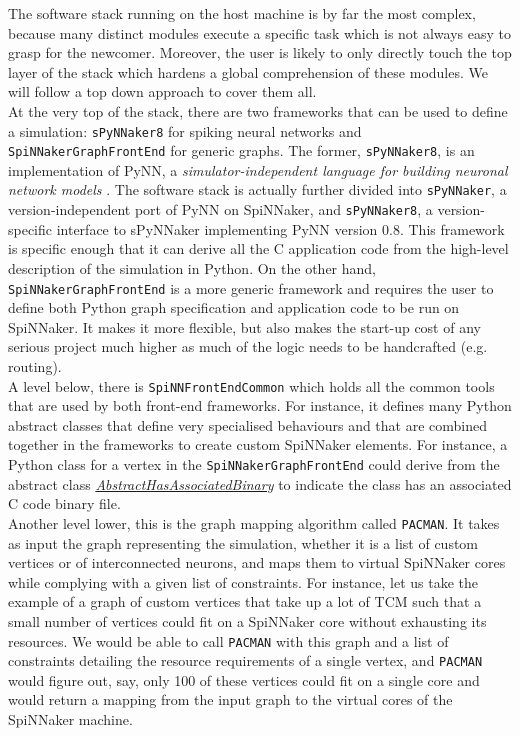 The software stack running on the host machine is by far the most complex, because many distinct modules execute a specific task which is not always easy to grasp for the newcomer. Moreover, the user is likely to only directly touch the top layer of the stack which hardens a global comprehension of these modules. We will follow a top down approach to cover them all. \\

At the very top of the stack, there are two frameworks that can be used to define a simulation: \texttt{sPyNNaker8} for spiking neural networks and \texttt{SpiNNakerGraphFrontEnd} for generic graphs. The former, \texttt{sPyNNaker8}, is an implementation of PyNN, a \textit{simulator-independent language for building neuronal network models} \cite{pynn}. The software stack is actually further divided into \texttt{sPyNNaker}, a version-independent port of PyNN on SpiNNaker, and \texttt{sPyNNaker8}, a version-specific interface to sPyNNaker implementing PyNN version 0.8. This framework is specific enough that it can derive all the C application code from the high-level description of the simulation in Python. On the other hand, \texttt{SpiNNakerGraphFrontEnd} is a more generic framework and requires the user to define both Python graph specification and application code to be run on SpiNNaker. It makes it more flexible, but also makes the start-up cost of any serious project much higher as much of the logic needs to be handcrafted (e.g. routing). \\

A level below, there is \texttt{SpiNNFrontEndCommon} which holds all the common tools that are used by both front-end frameworks. For instance, it defines many 
Python abstract classes that define very specialised behaviours and that are combined together in the frameworks to create custom SpiNNaker elements. For instance, a Python class for a vertex in the \texttt{SpiNNakerGraphFrontEnd} could derive from the abstract class \href{https://github.com/SpiNNakerManchester/SpiNNFrontEndCommon/blob/master/spinn_front_end_common/abstract_models/abstract_has_associated_binary.py}{\textit{AbstractHasAssociatedBinary}} to indicate the class has an associated C code binary file. \\ %

Another level lower, this is the graph mapping algorithm called \texttt{PACMAN}. It takes as input the graph representing the simulation, whether it is a list of custom vertices or of interconnected neurons, and maps them to virtual SpiNNaker cores while complying with a given list of constraints. For instance, let us take the example of a graph of custom vertices that take up a lot of TCM such that a small number of vertices could fit on a SpiNNaker core without exhausting its resources. We would be able to call \texttt{PACMAN} with this graph and a list of constraints detailing the resource requirements of a single vertex, and \texttt{PACMAN} would figure out, say, only 100 of these vertices could fit on a single core and would return a mapping from the input graph to the virtual cores of the SpiNNaker machine. \\ 

